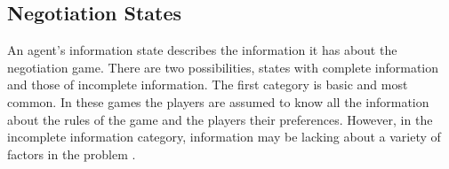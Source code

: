 









\subsection{Negotiation States}
An agent’s information state describes the information it has about the negotiation game. There are two possibilities, states with complete information and those of incomplete information. The first category is basic and most common. In these games the players are assumed to know all the information about the rules of the game and the players their preferences. However, in the incomplete information category, information may be lacking about a variety of factors in the problem \citep{fatima2004agenda}. %


